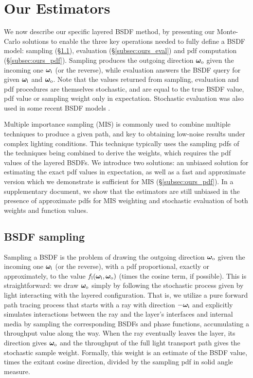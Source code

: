 \section{Our Estimators}
\label{sec:layeredbsdf:ours}

We now describe our specific layered BSDF method,
by presenting our Monte-Carlo solutions to enable the three key operations needed to fully define a BSDF model:
sampling (\S\ref{subsec:ours_sample}), evaluation (\S\ref{subsec:ours_eval}) and pdf computation (\S\ref{subsec:ours_pdf}).
Sampling produces the outgoing direction $\bm\omega_\mathrm{o}$ given the incoming one $\bm\omega_\mathrm{i}$ (or the reverse), while evaluation answers the BSDF query for given $\bm\omega_\mathrm{i}$ and $\bm\omega_\mathrm{o}$. Note that the values returned from sampling, evaluation and pdf procedures are themselves stochastic, and are equal to the true BSDF value, pdf value or sampling weight only in expectation. Stochastic evaluation was also used in some recent BSDF models \cite{heitz2016multiple}. 

Multiple importance sampling (MIS) is commonly used to combine multiple techniques to produce a given path, and key to obtaining low-noise results under complex lighting conditions. This technique typically uses the sampling pdfs of the techniques being combined to derive the weights, which requires the pdf values of the layered BSDFs. We introduce two solutions: an unbiased solution for estimating the exact pdf values in expectation, as well as a fast and approximate version which we demonstrate is sufficient for MIS (\S\ref{subsec:ours_pdf}). In a supplementary document, we show that the estimators are still unbiased in the presence of approximate pdfs for MIS weighting and stochastic evaluation of both weights and function values.

\subsection{BSDF sampling}
\label{subsec:ours_sample}

Sampling a BSDF is the problem of drawing the outgoing direction $\bm\omega_\mathrm{o}$ given the incoming one $\bm\omega_\mathrm{i}$ (or the reverse), with a pdf proportional, exactly or approximately, to the value $f_\mathrm{l}(\bm\omega_\mathrm{i}, \bm\omega_\mathrm{o})$ (times the cosine term, if possible).
This is straightforward: we draw $\bm\omega_\mathrm{o}$ simply by following the stochastic process given by light interacting with the layered configuration.
That is, we utilize a pure forward path tracing process that starts with a ray with direction $-\bm\omega_\mathrm{i}$ and explicitly simulates interactions between the ray and the layer's interfaces and internal media by sampling the corresponding BSDFs and phase functions, accumulating a throughput value along the way.
When the ray eventually leaves the layer, its direction gives $\bm\omega_\mathrm{o}$ and the throughput of the full light transport path gives the stochastic sample weight. Formally, this weight is an estimate of the BSDF value, times the exitant cosine direction, divided by the sampling pdf in solid angle measure.

